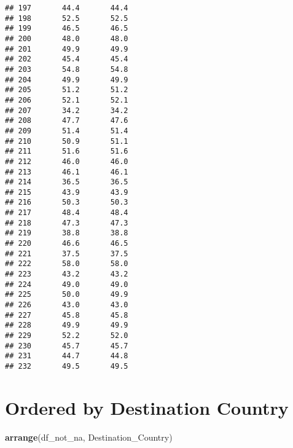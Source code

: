 \documentclass[]{article}
\newenvironment{Shaded}{\begin{snugshade}}{\end{snugshade}}
\newcommand{\KeywordTok}[1]{\textcolor[rgb]{0.13,0.29,0.53}{\textbf{#1}}}
\newcommand{\NormalTok}[1]{#1}
\begin{document}
\begin{verbatim}
## 197       44.4       44.4
## 198       52.5       52.5
## 199       46.5       46.5
## 200       48.0       48.0
## 201       49.9       49.9
## 202       45.4       45.4
## 203       54.8       54.8
## 204       49.9       49.9
## 205       51.2       51.2
## 206       52.1       52.1
## 207       34.2       34.2
## 208       47.7       47.6
## 209       51.4       51.4
## 210       50.9       51.1
## 211       51.6       51.6
## 212       46.0       46.0
## 213       46.1       46.1
## 214       36.5       36.5
## 215       43.9       43.9
## 216       50.3       50.3
## 217       48.4       48.4
## 218       47.3       47.3
## 219       38.8       38.8
## 220       46.6       46.5
## 221       37.5       37.5
## 222       58.0       58.0
## 223       43.2       43.2
## 224       49.0       49.0
## 225       50.0       49.9
## 226       43.0       43.0
## 227       45.8       45.8
## 228       49.9       49.9
## 229       52.2       52.0
## 230       45.7       45.7
## 231       44.7       44.8
## 232       49.5       49.5
\end{verbatim}

\hypertarget{ordered-by-destination-country}{%
\section{Ordered by Destination
Country}\label{ordered-by-destination-country}}

\begin{Shaded}
\begin{Highlighting}[]
\KeywordTok{arrange}\NormalTok{(df_not_na, Destination_Country)}
\end{Highlighting}
\end{Shaded}
\end{document}
